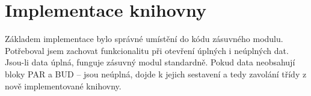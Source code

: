 \section{Implementace knihovny}
Základem implementace bylo správné umístění do kódu zásuvného modulu. Potřeboval jsem zachovat funkcionalitu při otevření úplných i neúplných dat. Jsou-li data úplná, funguje zásuvný modul standardně. Pokud data neobsahují bloky PAR a BUD -- jsou neúplná, dojde k jejich sestavení a tedy zavolání třídy z nově implementované knihovny.